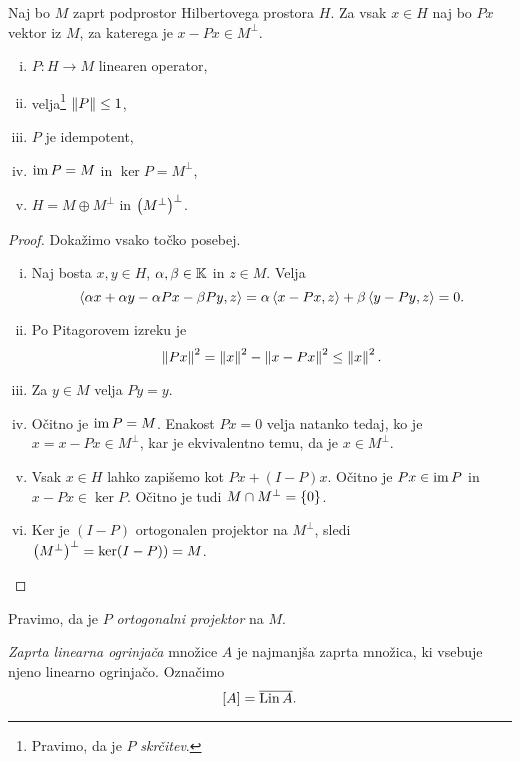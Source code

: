 \begin{izrek}
Naj bo $M$ zaprt podprostor Hilbertovega prostora $H$. Za vsak
$x \in H$ naj bo $Px$ vektor iz $M$, za katerega je
$x - Px \in M^\bot$.

\begin{enumerate}[i)]
\item $P \colon H \to M$ linearen operator,
\item velja\footnote{Pravimo, da je $P$ \emph{skrčitev}.}
$\left\lVert P\right\rVert \leq 1$,
\item $P$ je idempotent,
\item $\operatorname{im} P = M$ in $\ker P = M^\bot$,
\item $H = M \oplus M^\bot$ in $\left(M^\bot\right)^\bot$.
\end{enumerate} 
\end{izrek}

\begin{proof}
Dokažimo vsako točko posebej.

\begin{enumerate}[i)]
\item Naj bosta $x, y \in H$, $\alpha, \beta \in \mathbb{K}$ in $z \in M$.
Velja
\[
\left\langle \alpha x + \alpha y - \alpha Px - \beta Py, z\right\rangle =
\alpha \left\langle x - Px, z\right\rangle + \beta \left\langle y - Py, z\right\rangle = 0.
\]
\item Po Pitagorovem izreku je
\[
\left\lVert Px\right\rVert^2 = \left\lVert x\right\rVert^2 - \left\lVert x - Px\right\rVert^2 \leq \left\lVert x\right\rVert^2.
\]
\item Za $y \in M$ velja $Py = y$.
\item Očitno je $\operatorname{im} P = M$. Enakost $Px = 0$ velja natanko tedaj,
ko je $x = x - Px \in M^\bot$, kar je ekvivalentno temu, da je
$x \in M^\bot$.
\item Vsak $x \in H$ lahko zapišemo kot $Px + (I-P)x$. Očitno je
$Px \in \operatorname{im} P$ in $x-Px \in \ker P$. Očitno je tudi
$M \cap M^\bot = \left\{0\right\}$.
\item Ker je $(I-P)$ ortogonalen projektor na $M^\bot$, sledi
$\left(M^\bot\right)^\bot = \ker(I-P)) = M$. \qedhere
\end{enumerate}
\end{proof}

\begin{opomba}
Pravimo, da je $P$
\emph{ortogonalni projektor}
na $M$.
\end{opomba}

\begin{definicija}
\emph{Zaprta linearna ogrinjača} množice $A$ je najmanjša zaprta
množica, ki vsebuje njeno linearno ogrinjačo. Označimo
\[
[A] = \overline{\operatorname{Lin} A}.
\]
\end{definicija}

